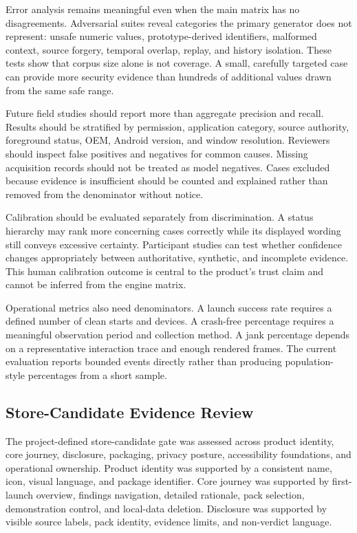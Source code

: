 Error analysis remains meaningful even when the main matrix has no disagreements. Adversarial suites reveal categories the primary generator does not represent: unsafe numeric values, prototype-derived identifiers, malformed context, source forgery, temporal overlap, replay, and history isolation. These tests show that corpus size alone is not coverage. A small, carefully targeted case can provide more security evidence than hundreds of additional values drawn from the same safe range.

Future field studies should report more than aggregate precision and recall. Results should be stratified by permission, application category, source authority, foreground status, OEM, Android version, and window resolution. Reviewers should inspect false positives and negatives for common causes. Missing acquisition records should not be treated as model negatives. Cases excluded because evidence is insufficient should be counted and explained rather than removed from the denominator without notice.

Calibration should be evaluated separately from discrimination. A status hierarchy may rank more concerning cases correctly while its displayed wording still conveys excessive certainty. Participant studies can test whether confidence changes appropriately between authoritative, synthetic, and incomplete evidence. This human calibration outcome is central to the product's trust claim and cannot be inferred from the engine matrix.

Operational metrics also need denominators. A launch success rate requires a defined number of clean starts and devices. A crash-free percentage requires a meaningful observation period and collection method. A jank percentage depends on a representative interaction trace and enough rendered frames. The current evaluation reports bounded events directly rather than producing population-style percentages from a short sample.

\subsection{Store-Candidate Evidence Review}

The project-defined store-candidate gate was assessed across product identity, core journey, disclosure, packaging, privacy posture, accessibility foundations, and operational ownership. Product identity was supported by a consistent name, icon, visual language, and package identifier. Core journey was supported by first-launch overview, findings navigation, detailed rationale, pack selection, demonstration control, and local-data deletion. Disclosure was supported by visible source labels, pack identity, evidence limits, and non-verdict language.

